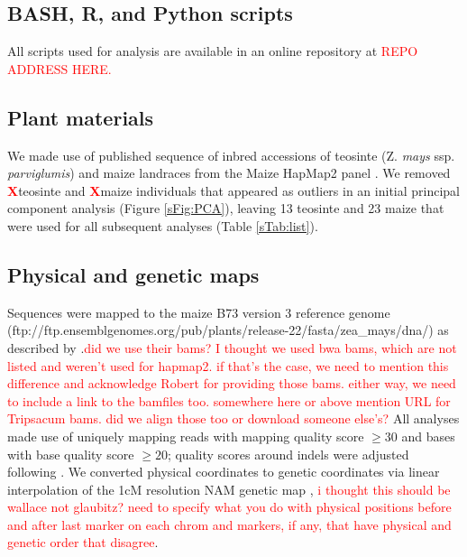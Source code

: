 \documentclass{pnastwo}
\newcommand{\jri}[1]{\textcolor{red}{\scriptsize #1}}
\newcommand{\X}{\textcolor{red}{\bf X}}
\begin{document}
\begin{article}
\begin{materials}

  \subsection{BASH, R, and Python scripts}
All scripts used for analysis are available in an online repository at \textcolor{red}{REPO ADDRESS HERE.} 

\subsection{Plant materials}
We made use of published sequence of inbred accessions of teosinte (Z. \emph{mays} ssp. \emph{parviglumis}) and maize landraces from the Maize HapMap2 panel \cite{chia2012, lemmon2014}. 
We removed \X teosinte and \X maize individuals that appeared as outliers in an initial principal component analysis  (Figure \ref{sFig:PCA}), leaving 13 teosinte and 23 maize that were used for all subsequent analyses (Table \ref{sTab:list}).

\subsection{Physical and genetic maps}
Sequences were mapped to the maize B73 version 3 reference genome \cite{schnable2009} (ftp://ftp.ensemblgenomes.org/pub/plants/release-22/fasta/zea\_mays/dna/) as described by \cite{chia2012}.\jri{did we use their bams? I thought we used bwa bams, which are not listed and weren't used for hapmap2. if that's the case, we need to mention this difference and acknowledge Robert for providing those bams. either way, we need to include a link to the bamfiles too. somewhere here or above mention URL for Tripsacum bams. did we align those too or download someone else's?}
All analyses made use of uniquely mapping reads with mapping quality score $\geq  30$ and bases with base quality score $\geq 20$; quality scores around indels were adjusted following \cite{li2011statistical}.
We converted physical coordinates to genetic coordinates via linear interpolation of the 1cM resolution NAM genetic map \cite{glaubitz2014}, \jri{i thought this should be wallace not glaubitz? need to specify what you do with physical positions before and after last marker on each chrom and markers, if any, that have physical and genetic order that disagree}.


\end{materials}
\end{article}
\end{document}
